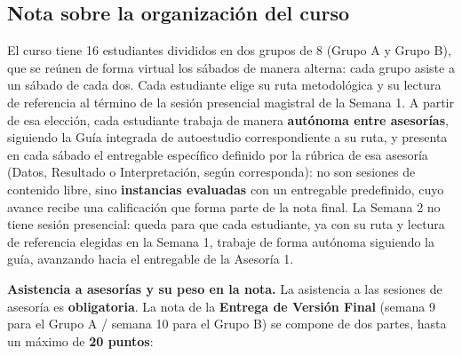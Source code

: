 \documentclass[11pt,a4paper]{article}
\begin{document}
\subsection{Nota sobre la organización del curso}
El curso tiene 16 estudiantes divididos en dos grupos de 8 (Grupo A y Grupo B), que se reúnen de forma virtual los sábados de manera alterna: cada grupo asiste a un sábado de cada dos. Cada estudiante elige su ruta metodológica y su lectura de referencia al término de la sesión presencial magistral de la Semana 1. A partir de esa elección, cada estudiante trabaja de manera \textbf{autónoma entre asesorías}, siguiendo la Guía integrada de autoestudio correspondiente a su ruta, y presenta en cada sábado el entregable específico definido por la rúbrica de esa asesoría (Datos, Resultado o Interpretación, según corresponda): no son sesiones de contenido libre, sino \textbf{instancias evaluadas} con un entregable predefinido, cuyo avance recibe una calificación que forma parte de la nota final. La Semana 2 no tiene sesión presencial: queda para que cada estudiante, ya con su ruta y lectura de referencia elegidas en la Semana 1, trabaje de forma autónoma siguiendo la guía, avanzando hacia el entregable de la Asesoría 1.

\noindent
\textbf{Asistencia a asesorías y su peso en la nota.} La asistencia a las sesiones de asesoría es \textbf{obligatoria}. La nota de la \textbf{Entrega de Versión Final} (semana 9 para el Grupo A / semana 10 para el Grupo B) se compone de dos partes, hasta un máximo de \textbf{20 puntos}:
\end{document}

